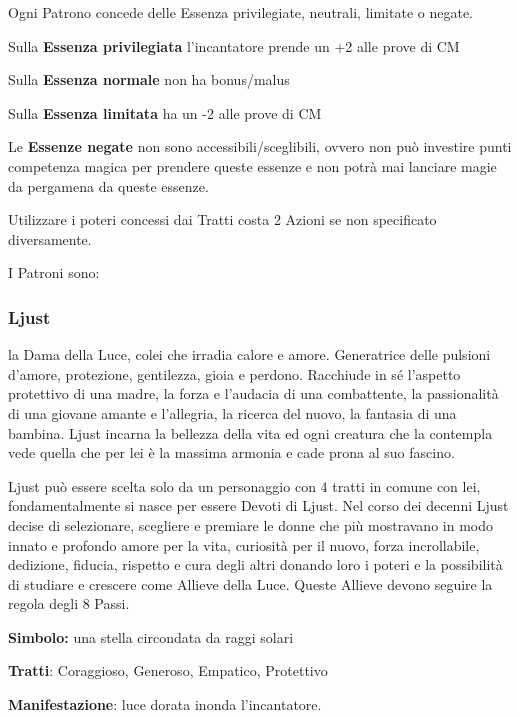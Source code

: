 \documentclass[a4paper,11pt,twoside,openany]{book}
\begin{document}
Ogni Patrono concede delle Essenza privilegiate, neutrali, limitate o negate.

Sulla \textbf{Essenza privilegiata} l'incantatore prende un +2 alle prove di CM

Sulla \textbf{Essenza normale} non ha bonus/malus

Sulla \textbf{Essenza limitata} ha un -2 alle prove di CM

Le \textbf{Essenze negate} non sono accessibili/sceglibili, ovvero non può investire punti competenza magica per prendere queste essenze e non potrà mai lanciare magie da pergamena da queste essenze.

Utilizzare i poteri concessi dai Tratti costa 2 Azioni se non specificato diversamente.

I Patroni sono:

\subsubsection{Ljust}

\label{ljust}

la Dama della Luce, colei che irradia calore e amore. Generatrice delle pulsioni d'amore, protezione, gentilezza, gioia e perdono. Racchiude in sé l'aspetto protettivo di una madre, la forza e l'audacia di una combattente, la passionalità di una giovane amante e l'allegria, la ricerca del nuovo, la fantasia di una bambina. Ljust incarna la bellezza della vita ed ogni creatura che la contempla vede quella che per lei è la massima armonia e cade prona al suo fascino.

Ljust può essere scelta solo da un personaggio con 4 tratti in comune con lei, fondamentalmente si nasce per essere Devoti di Ljust. Nel corso dei decenni Ljust decise di selezionare, scegliere e premiare le donne che più mostravano in modo innato e profondo amore per la vita, curiosità per il nuovo, forza incrollabile, dedizione, fiducia, rispetto e cura degli altri donando loro i poteri e la possibilità di studiare e crescere come Allieve della Luce. Queste Allieve devono seguire la regola degli 8 Passi.

\textbf{Simbolo:} una stella circondata da raggi solari

\textbf{Tratti}: Coraggioso, Generoso, Empatico, Protettivo

\textbf{Manifestazione}: luce dorata inonda l'incantatore.
\end{document}

